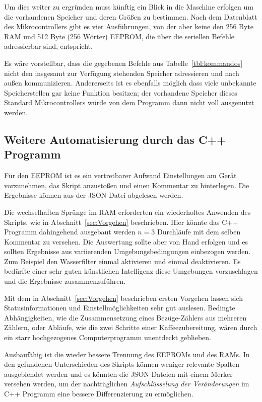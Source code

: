 Um dies weiter zu ergründen muss künftig ein Blick in die Maschine erfolgen um die vorhandenen Speicher und deren Größen zu bestimmen.
Nach dem Datenblatt des Mikrocontrollers \cite{JuraMicrocontroller} gibt es vier Ausführungen, von der aber keine den 256 Byte \ac{RAM} und 512 Byte (256 Wörter) \ac{EEPROM}, die über die seriellen Befehle adressierbar sind, entspricht.

Es wäre vorstellbar, dass die gegebenen Befehle aus Tabelle~\ref{tbl:kommandos} nicht den insgesamt zur Verfügung stehenden Speicher adressieren und nach außen kommunizieren.
Andererseits ist es ebenfalls möglich dass viele unbekannte Speicherstellen gar keine Funktion besitzen;
der vorhandene Speicher dieses Standard Mikrocontrollers würde von dem Programm dann nicht voll ausgenutzt werden.

\subsection{Weitere Automatisierung durch das C++ Programm}
Für den \ac{EEPROM} ist es ein vertretbarer Aufwand Einstellungen am Gerät vorzunehmen, das Skript anzustoßen und einen Kommentar zu hinterlegen.
Die Ergebnisse können aus der \ac{JSON} Datei abgelesen werden.

Die wechselhaften Sprünge im \ac{RAM} erforderten ein wiederholtes Anwenden des Skripts, wie in Abschnitt~\ref{sec:Vorgehen} beschrieben.
Hier könnte das C++ Programm dahingehend ausgebaut werden $n=3$ Durchläufe mit dem selben Kommentar zu versehen.
Die Auswertung sollte aber von Hand erfolgen und es sollten Ergebnisse aus variierenden Umgebungsbedingungen einbezogen werden.
Zum Beispiel den Wasserfilter einmal aktivieren und einmal deaktivieren.
Es bedürfte einer sehr guten künstlichen Intelligenz diese Umgebungen vorzuschlagen und die Ergebnisse zusammenzuführen.

Mit dem in Abschnitt~\ref{sec:Vorgehen} beschrieben ersten Vorgehen lassen sich Statusinformationen und Einstellmöglichkeiten sehr gut auslesen.
Bedingte Abhängigkeiten, wie die Zusammensetzung eines Bezüge-Zählers aus mehreren Zählern, oder Abläufe, wie die zwei Schritte einer Kaffeezubereitung, wären durch ein starr hochgezogenes Computerprogramm unentdeckt geblieben.

Ausbaufähig ist die wieder bessere Trennung des \ac{EEPROM}s und des \ac{RAM}s.
In den gefundenen Unterschieden des Skripts können weniger relevante Spalten ausgeblendet werden und es könnten die \ac{JSON} Dateien mit einem Merker versehen werden, um der nachträglichen \textit{Aufschlüsselung der Veränderungen} im C++ Programm eine bessere Differenzierung zu ermöglichen.


